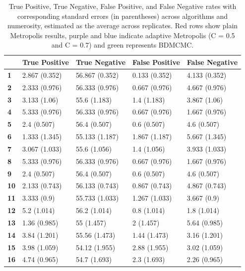 \documentclass{report}
\begin{document}
\begin{table}[!h]
	\centering
	\begin{tabular}{|l|l|l|l|l|}
		\hline
		\textbf{} & \textbf{True Positive} & \textbf{True Negative} & \textbf{False Positive} & \textbf{False Negative} \\ \hline
		\rowcolor{red!10} \textbf{1} & 2.867 (0.352) & 56.867 (0.352) & 0.133 (0.352) & 4.133 (0.352) \\ \hline
		\rowcolor{red!10} \textbf{2} & 2.333 (0.976) & 56.333 (0.976) & 0.667 (0.976) & 4.667 (0.976) \\ \hline
		\rowcolor{red!10} \textbf{3} & 3.133 (1.06) & 55.6 (1.183) & 1.4 (1.183) & 3.867 (1.06) \\ \hline
		\rowcolor{red!10} \textbf{4} & 5.333 (0.976) & 56.333 (0.976) & 0.667 (0.976) & 1.667 (0.976) \\ \hline
		\rowcolor{blue!7} \textbf{5} & 2.4 (0.507) & 56.4 (0.507) & 0.6 (0.507) & 4.6 (0.507) \\ \hline
		\rowcolor{blue!7} \textbf{6} & 1.333 (1.345) & 55.133 (1.187) & 1.867 (1.187) & 5.667 (1.345) \\ \hline
		\rowcolor{blue!7} \textbf{7} & 3.067 (1.033) & 55.6 (1.056) & 1.4 (1.056) & 3.933 (1.033) \\ \hline
		\rowcolor{blue!7} \textbf{8} & 5.333 (0.976) & 56.333 (0.976) & 0.667 (0.976) & 1.667 (0.976) \\ \hline
		\rowcolor{cyan!10} \textbf{9} & 2.4 (0.507) & 56.4 (0.507) & 0.6 (0.507) & 4.6 (0.507) \\ \hline
		\rowcolor{cyan!10} \textbf{10} & 2.133 (0.743) & 56.133 (0.743) & 0.867 (0.743) & 4.867 (0.743) \\ \hline
		\rowcolor{cyan!10} \textbf{11} & 3.333 (0.9) & 55.733 (1.033) & 1.267 (1.033) & 3.667 (0.9) \\ \hline
		\rowcolor{cyan!10} \textbf{12} & 5.2 (1.014) & 56.2 (1.014) & 0.8 (1.014) & 1.8 (1.014) \\ \hline
		\rowcolor{green!8} \textbf{13} & 1.36 (0.985) & 55 (1.457) & 2 (1.457) & 5.64 (0.985) \\ \hline
		\rowcolor{green!8} \textbf{14} & 3.84 (1.201) & 55.56 (1.473) & 1.44 (1.473) & 3.16 (1.201) \\ \hline
		\rowcolor{green!8} \textbf{15} & 3.98 (1.059) & 54.12 (1.955) & 2.88 (1.955) & 3.02 (1.059) \\ \hline
		\rowcolor{green!8} \textbf{16} & 4.74 (0.965) & 54.7 (1.693) & 2.3 (1.693) & 2.26 (0.965) \\ \hline
	\end{tabular}
	\caption{True Positive, True Negative, False Positive, and False Negative rates with corresponding standard errors (in parentheses) across algorithms and numerosity, estimated as the average across replicates. Red rows show plain Metropolis results, purple and blue indicate adaptive Metropolis (C = 0.5 and C = 0.7) and green represents BDMCMC.}
	\label{table:metrics-first}
\end{table}
\end{document}
